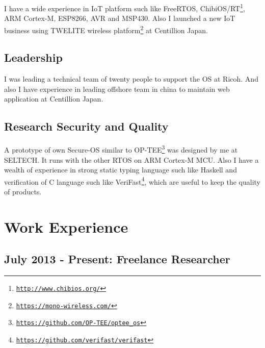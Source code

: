 \documentclass[letterpaper]{article}
\begin{document}
I have a wide experience in IoT platform such like FreeRTOS, ChibiOS/RT\footnote{\href{http://www.chibios.org/}{\tt http://www.chibios.org/}}, ARM Cortex-M, ESP8266, AVR and MSP430. Also I launched a new IoT business using TWELITE wireless platform\footnote{\href{https://mono-wireless.com/}{\tt https://mono-wireless.com/}} at Centillion Japan.

\subsection*{Leadership}

I was leading a technical team of twenty people to support the OS at Ricoh. And also I have experience in leading offshore team in china to maintain web application at Centillion Japan.

\subsection*{Research Security and Quality}

A prototype of own Secure-OS similar to OP-TEE\footnote{\href{https://github.com/OP-TEE/optee\_os}{\tt https://github.com/OP-TEE/optee\_os}} was designed by me at SELTECH. It runs with the other RTOS on ARM Cortex-M MCU. Also I have a wealth of experience in strong static typing language such like Haskell and verification of C language such like VeriFast\footnote{\href{https://github.com/verifast/verifast}{\tt https://github.com/verifast/verifast}}, which are useful to keep the quality of products.

\newpage

\section*{Work Experience}

\subsection*{July 2013 - Present: Freelance Researcher}
\end{document}
